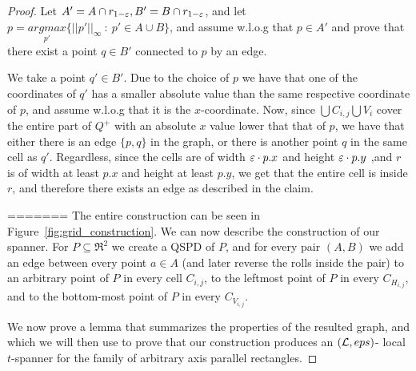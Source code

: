 \documentclass[12pt]{article}%
\begin{document}
\begin{proof}
    Let $A'=A\cap r_{1-\varepsilon}, B'=B \cap r_{1-\varepsilon}$, and let
    $p= \underset{p'}{argmax}\{||p'||_{\infty}~:~ p'\in A\cup B\}$,
    and assume w.l.o.g that $p\in A'$ and prove that there exist a
    point $q\in B'$ connected to $p$ by an edge.
    
    We take a point $q'\in B'$. Due to the choice of $p$ we have that
    one of the coordinates of $q'$ has a smaller absolute value than
    the same respective coordinate of $p$, and assume w.l.o.g that it
    is the $x$-coordinate. Now, since $\bigcup C_{i,j} \bigcup V_i$
    cover the entire part of $Q^+$ with an absolute $x$ value lower
    that that of $p$, we have that either there is an edge $\{p,q\}$
    in the graph, or there is another point $q$ in the same cell as
    $q'$. Regardless, since the cells are of width $\varepsilon\cdot p.x$ and
    height $\varepsilon\cdot p.y$ ,and $r$ is of width at least $p.x$ and
    height at least $p.y$, we get that the entire cell is inside $r$,
    and therefore there exists an edge as described in the claim.
    
=======
The entire construction can be seen in Figure~\ref{fig:grid_construction}. We can now describe the construction of our spanner. For $P\subseteq \Re^2$ we create a QSPD of $P$, and for every pair $(A,B)$ we add an edge between every point $a\in A$ (and later reverse the rolls inside the pair) to an arbitrary point of $P$ in every cell $C_{i,j}$, to the leftmost point of $P$ in every $C_{H_{i,j}}$, and to the bottom-most point of $P$ in every $C_{V_{i,j}}$.

We now prove a lemma that summarizes the properties of the resulted graph, and which we will then use to prove that our construction produces an $(\mathcal{L}, eps)$- local $t$-spanner for the family of arbitrary axis parallel rectangles. 


\end{proof}
\end{document}
